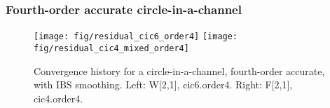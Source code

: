 \documentclass{article}
\begin{document}

\subsubsection{Fourth-order accurate circle-in-a-channel}


\begin{figure}[hbt]
\begin{center}
  \texttt{[image: fig/residual\_cic6\_order4]}
  \texttt{[image: fig/residual\_cic4\_mixed\_order4]}
  \end{center} 
\caption{Convergence history for a circle-in-a-channel, fourth-order accurate, with IBS smoothing. Left: W[2,1], cic6.order4.
    Right: F[2,1], cic4.order4. }
\label{fig:square1024}
\end{figure}



% 
\end{document}
